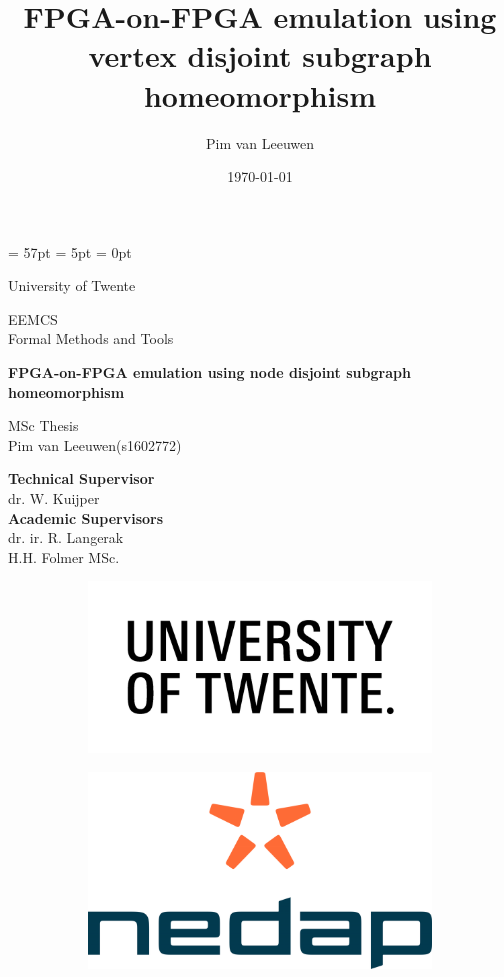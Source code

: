\documentclass[12pt, oneside]{report}
\author{\me}
\title{FPGA-on-FPGA emulation using vertex disjoint subgraph homeomorphism}
\author{Pim van Leeuwen}
\date{\today}
\theoremstyle{plain}
\theoremstyle{definition}
\theoremstyle{indented}
\newcommand{\doctitle}{FPGA-on-FPGA emulation using node disjoint subgraph homeomorphism}
\newcommand{\docsubtitle}{MSc Thesis}
\newcommand{\me}{Pim van Leeuwen}
\newcommand{\studentcode}{s1602772}
\newcommand{\university}{University of Twente}
\newcommand{\school}{EEMCS}
\newcommand{\department}{Formal Methods and Tools}
\newcommand{\supervisor}{dr. W. Kuijper}
\newcommand{\cosupervisor}{dr. ir. R. Langerak}
\newcommand{\cocosupervisor}{H.H. Folmer MSc.}
\begin{document}

\begin{titlepage}
\headheight = 57pt
\footskip = 5pt
\headsep = 0pt


{\begin{Large}
\university\\
\end{Large} }
\school\\
\department\\

\vspace*{5 cm}



\begin{Large}
\textbf{\doctitle}\\
\end{Large}
\docsubtitle\\
\me \quad (\studentcode)\\

\begin{flushright}
\textbf{Technical Supervisor}\\ \supervisor\\
\textbf{Academic Supervisors}\\\cosupervisor\\
\cocosupervisor
\end{flushright}

\vspace*{3cm}
\begin{figure}[h]
\centering
\begin{subfigure}{.5\textwidth}
  \centering
  \includegraphics[width=.5\linewidth]{images/utwente.png}
\end{subfigure}%
\begin{subfigure}{.5\textwidth}
  \centering
  \includegraphics[width=.4\linewidth]{images/nedap.png}
\end{subfigure}
\end{figure}





\vfill
\end{titlepage}
\end{document}
